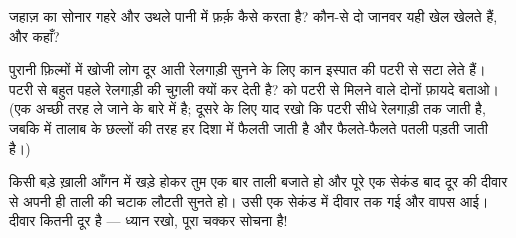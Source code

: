 \begin{exercise}[$\star$]\label{exo:g4:how-sound-travels:9}
जहाज़ का सोनार गहरे और उथले पानी में फ़र्क़ कैसे करता है? कौन-से दो
जानवर यही खेल खेलते हैं, और कहाँ?
\end{exercise}

\begin{exercise}[$\star\star$]\label{exo:g4:how-sound-travels:10}
पुरानी फ़िल्मों में खोजी लोग दूर आती रेलगाड़ी सुनने के लिए कान इस्पात
की पटरी से सटा लेते हैं। पटरी  से बहुत पहले रेलगाड़ी की चुग़ली क्यों
कर देती है?  को पटरी से मिलने वाले दोनों फ़ायदे बताओ। (एक अच्छी
तरह ले जाने के बारे में है; दूसरे के लिए याद रखो कि पटरी सीधे
रेलगाड़ी तक जाती है, जबकि  में  तालाब के छल्लों की तरह हर दिशा
में फैलती जाती है और फैलते-फैलते पतली पड़ती जाती है।)
\end{exercise}

\begin{exercise}[$\star\star$]\label{exo:g4:how-sound-travels:11}
किसी बड़े ख़ाली आँगन में खड़े होकर तुम एक बार ताली बजाते हो और पूरे
एक सेकंड बाद दूर की दीवार से अपनी ही ताली की चटाक लौटती सुनते हो।
 उसी एक सेकंड में दीवार तक गई और वापस आई। दीवार कितनी दूर है ---
ध्यान रखो, पूरा चक्कर सोचना है!
\end{exercise}
